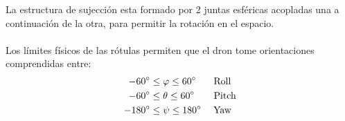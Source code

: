 La estructura de sujección esta formado por 2 juntas esféricas acopladas una a continuación de la otra, para permitir la rotación en el espacio. 
\\

\\

Los límites físicos de las rótulas permiten que el dron tome orientaciones comprendidas entre:
\begin{align*}
	 -60 \degree &\le \varphi \le 60\degree \quad \;\;\;  \text{Roll}\\ 
	 -60 \degree&\le \theta \le 60\degree \qquad  \text{Pitch} \\
	 -180 \degree&\le \psi \le 180\degree\quad \;  \text{Yaw}
\end{align*}

